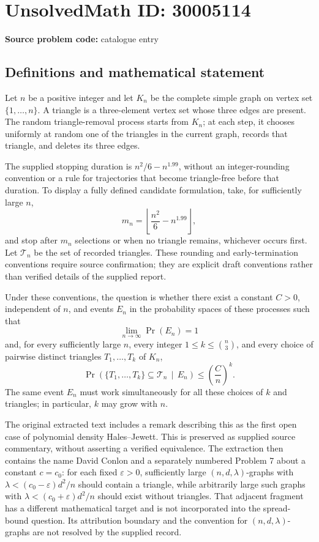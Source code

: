 \documentclass[11pt]{article}
\begin{document}
\section*{UnsolvedMath ID: 30005114}
\textbf{Source problem code:} catalogue entry
\subsection{Definitions and mathematical statement}
Let \(n\) be a positive integer and let \(K_n\) be the complete simple graph on vertex set \(\{1,\ldots,n\}\). A triangle is a three-element vertex set whose three edges are present. The random triangle-removal process starts from \(K_n\); at each step, it chooses uniformly at random one of the triangles in the current graph, records that triangle, and deletes its three edges.

The supplied stopping duration is \(n^2/6-n^{1.99}\), without an integer-rounding convention or a rule for trajectories that become triangle-free before that duration. To display a fully defined candidate formulation, take, for sufficiently large \(n\),
\[
 m_n=\left\lfloor \frac{n^2}{6}-n^{1.99}\right\rfloor,
\]
and stop after \(m_n\) selections or when no triangle remains, whichever occurs first. Let \(\mathcal T_n\) be the set of recorded triangles. These rounding and early-termination conventions require source confirmation; they are explicit draft conventions rather than verified details of the supplied report.

Under these conventions, the question is whether there exist a constant \(C>0\), independent of \(n\), and events \(E_n\) in the probability spaces of these processes such that
\[
 \lim_{n\to\infty}\Pr(E_n)=1
\]
and, for every sufficiently large \(n\), every integer \(1\le k\le\binom n3\), and every choice of pairwise distinct triangles \(T_1,\ldots,T_k\) of \(K_n\),
\[
 \Pr\!\left(\{T_1,\ldots,T_k\}\subseteq\mathcal T_n\,\middle|\,E_n\right)
 \le \left(\frac Cn\right)^k.
\]
The same event \(E_n\) must work simultaneously for all these choices of \(k\) and triangles; in particular, \(k\) may grow with \(n\).

The original extracted text includes a remark describing this as the first open case of polynomial density Hales--Jewett. This is preserved as supplied source commentary, without asserting a verified equivalence. The extraction then contains the name David Conlon and a separately numbered Problem 7 about a constant \(c=c_0\): for each fixed \(\varepsilon>0\), sufficiently large \((n,d,\lambda)\)-graphs with \(\lambda<(c_0-\varepsilon)d^2/n\) should contain a triangle, while arbitrarily large such graphs with \(\lambda<(c_0+\varepsilon)d^2/n\) should exist without triangles. That adjacent fragment has a different mathematical target and is not incorporated into the spread-bound question. Its attribution boundary and the convention for \((n,d,\lambda)\)-graphs are not resolved by the supplied record.
\end{document}
